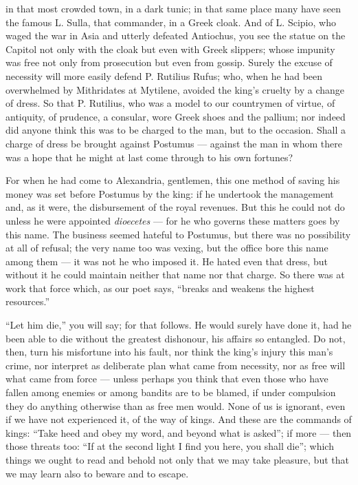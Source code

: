  in that most crowded town, in a dark tunic; in that same place many have seen the famous L. Sulla, that commander, in a Greek cloak. And of L. Scipio, who waged the war in Asia and utterly defeated Antiochus, you see the statue on the Capitol not only with the cloak but even with Greek slippers; whose impunity was free not only from prosecution but even from gossip. Surely the excuse of necessity will more easily defend P. Rutilius Rufus; who, when he had been overwhelmed by Mithridates at Mytilene, avoided the king's cruelty by a change of dress. So that P. Rutilius, who was a model to our countrymen of virtue, of antiquity, of prudence, a consular, wore Greek shoes and the pallium; nor indeed did anyone think this was to be charged to the man, but to the occasion. Shall a charge of dress be brought against Postumus --- against the man in whom there was a hope that he might at last come through to his own fortunes?

 For when he had come to Alexandria, gentlemen, this one method of saving his money was set before Postumus by the king: if he undertook the management and, as it were, the disbursement of the royal revenues. But this he could not do unless he were appointed \textit{dioecetes} --- for he who governs these matters goes by this name. The business seemed hateful to Postumus, but there was no possibility at all of refusal; the very name too was vexing, but the office bore this name among them --- it was not he who imposed it. He hated even that dress, but without it he could maintain neither that name nor that charge. So there was at work that force which, as our poet says, ``breaks and weakens the highest resources.''

 ``Let him die,'' you will say; for that follows. He would surely have done it, had he been able to die without the greatest dishonour, his affairs so entangled. Do not, then, turn his misfortune into his fault, nor think the king's injury this man's crime, nor interpret as deliberate plan what came from necessity, nor as free will what came from force --- unless perhaps you think that even those who have fallen among enemies or among bandits are to be blamed, if under compulsion they do anything otherwise than as free men would. None of us is ignorant, even if we have not experienced it, of the way of kings. And these are the commands of kings: ``Take heed and obey my word, and beyond what is asked''; if more --- then those threats too: ``If at the second light I find you here, you shall die''; which things we ought to read and behold not only that we may take pleasure, but that we may learn also to beware and to escape.

